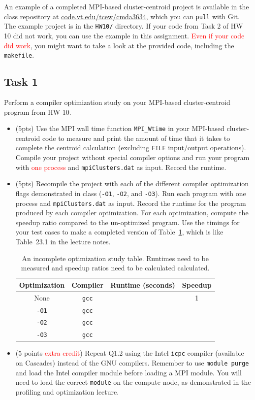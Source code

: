 
An example of a completed MPI-based cluster-centroid project is available in the class repository at \href{https://code.vt.edu/tcew/cmda3634}{code.vt.edu/tcew/cmda3634},
which you can \texttt{pull} with Git.
The example project is in the \texttt{HW10/} directory.
If your code from Task 2 of HW 10 did not work, you can use the example in this assignment.
\textcolor{red}{Even if your code did work}, you might want to take a look at the provided code, including the \texttt{makefile}.

\subsection*{Task 1}
Perform a compiler optimization study on your MPI-based cluster-centroid program from HW 10.
\begin{itemize}
    \item[Q1.1] (5pts) Use the MPI wall time function \texttt{MPI\_Wtime} in your MPI-based cluster-centroid code to measure and print the amount of time that it takes to complete the centroid calculation (excluding \texttt{FILE} input/output operations).
    Compile your project without special compiler options and run your program with \textcolor{red}{one process} and \texttt{mpiClusters.dat} as input.
    Record the runtime.
    
    \item[Q1.2] (5pts) Recompile the project with each of the different compiler optimization flags demonstrated in class (\texttt{-O1}, \texttt{-O2}, and \texttt{-O3}).
    Run each program with one process and \texttt{mpiClusters.dat} as input.
    Record the runtime for the program produced by each compiler optimization.
    For each optimization, compute the speedup ratio compared to the un-optimized program.
    Use the timings for your test cases to make a completed version of Table~\ref{tab_opt},
    which is like Table~23.1 in the lecture notes.
\begin{table}[htbp]
    \centering
    \begin{tabular}{c|c|c|c}
        Optimization & Compiler & Runtime (seconds) & Speedup\\
        \hline\hline
        None & \texttt{gcc} & & 1\\
        \hline
        \texttt{-O1} & \texttt{gcc} & \\
        \hline
        \texttt{-O2} & \texttt{gcc} & \\
        \hline
        \texttt{-O3} & \texttt{gcc} & \\
    \end{tabular}
    \caption{An incomplete optimization study table. Runtimes need to be measured and speedup ratios need to be calculated calculated.}
    \label{tab_opt}
\end{table}
    \item[Q1.3] (5 points \textcolor{red}{extra credit})
    Repeat Q1.2 using the Intel \texttt{icpc} compiler (available on Cascades) instead of the GNU compilers.
    Remember to use \texttt{module purge} and load the Intel compiler module before loading a MPI module.
    You will need to load the correct \texttt{module} on the compute node, as demonstrated in the profiling and optimization lecture.
    

\end{itemize}
